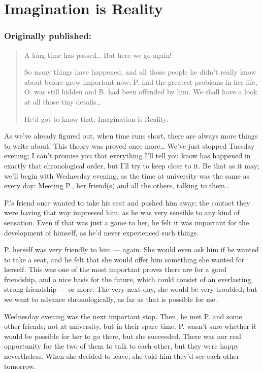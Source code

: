 \chapter{Imagination is Reality}
\label{cha:imagination-is-reality}
\subsection*{Originally published: }
\begin{quote}
A long time has passed\dots{} But here we go again!

So many things have happened, and all those people he didn't really know about before grew important now; P. had the greatest problems in her life, O. was still hidden and B. had been offended by him. We shall have a look at all those tiny details\dots{}

He'd got to know that: Imagination is Reality.
\end{quote}

As we've already figured out, when time runs short, there are always more things to write about. This theory was proved once more\dots{}
We've just stopped Tuesday evening; I can't promise you that everything I'll tell you know has happened in exactly that chronological order, but I'll try to keep close to it. 
Be that as it may; we'll begin with Wednesday evening, as the time at university was the same as every day: Meeting P., her friend(s) and all the others, talking to them\dots{}

P.'s friend once wanted to take his seat and pushed him away; the contact they were having that way impressed him, as he was very sensible to any kind of sensation. Even if that was just a game to her, he felt it was important for the development of himself, as he'd never experienced such things.

P. herself was very friendly to him --- again. She would even ask him if he wanted to take a seat, and he felt that she would offer him something she wanted for herself. This was one of the most important proves there are for a good friendship, and a nice basis for the future, which could consist of an everlasting, strong friendship --- or more. The very next day, she would be very troubled; but we want to advance chronologically, as far as that is possible for me.

Wednesday evening was the next important stop. Then, he met P. and some other friends; not at university, but in their spare time. P. wasn't sure whether it would be possible for her to go there, but she succeeded. There was nor real opportunity for the two of them to talk to each other, but they were happy nevertheless. When she decided to leave, she told him they'd see each other tomorrow.

